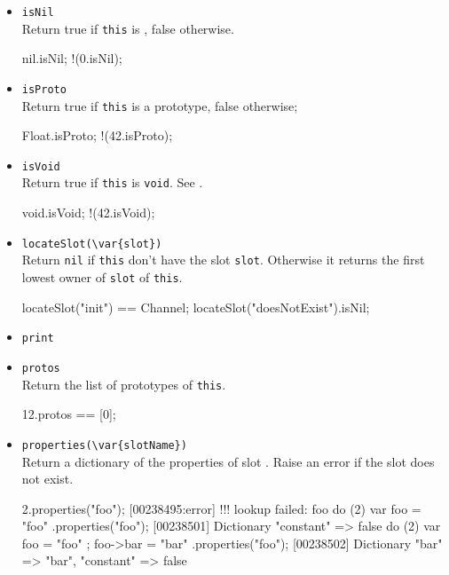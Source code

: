 \begin{itemize}
\item \lstinline|isNil|\\
  Return true if \lstinline|this| is , false otherwise.

\begin{urbiassert}
nil.isNil;
!(0.isNil);
\end{urbiassert}

\item \lstinline|isProto|\\
  Return true if \lstinline|this| is a prototype, false otherwise;

\begin{urbiassert}
Float.isProto;
!(42.isProto);
\end{urbiassert}

\item \lstinline|isVoid|\\
  Return true if \lstinline|this| is \lstinline|void|.  See
  .
\begin{urbiassert}
void.isVoid;
!(42.isVoid);
\end{urbiassert}

\item \lstinline|locateSlot(\var{slot})|\\
  Return \lstinline|nil| if \lstinline|this| don't have the slot
  \lstinline|slot|. Otherwise it returns the first lowest owner of
  \lstinline|slot| of \lstinline|this|.

\begin{urbiassert}
locateSlot("init") == Channel;
locateSlot("doesNotExist").isNil;
\end{urbiassert}

\item \lstinline|print|\\

\item \lstinline|protos|\\
  Return the list of prototypes of \lstinline|this|.
\begin{urbiassert}
12.protos == [0];
\end{urbiassert}

\item \lstinline|properties(\var{slotName})|\\
  Return a dictionary of the properties of slot .  Raise
  an error if the slot does not exist.
\begin{urbiscript}
2.properties("foo");
[00238495:error] !!! lookup failed: foo
do (2) { var foo = "foo" }.properties("foo");
[00238501] Dictionary {"constant" => false}
do (2) { var foo = "foo" ; foo->bar = "bar" }.properties("foo");
[00238502] Dictionary {"bar" => "bar", "constant" => false}
\end{urbiscript}


\end{itemize}
